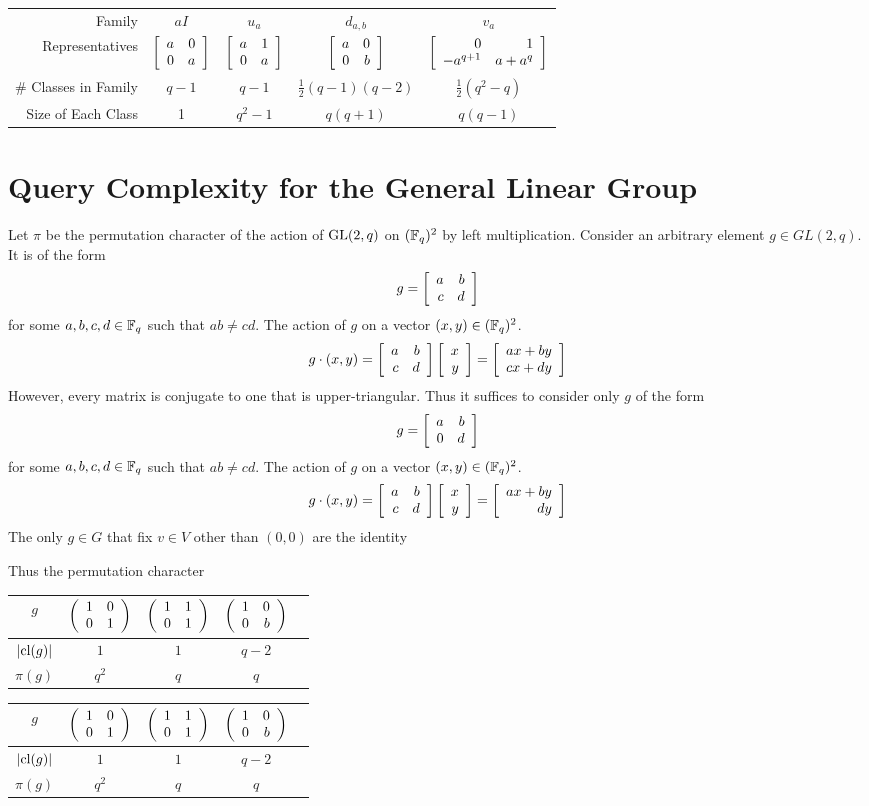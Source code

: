 \begin{center}
\begin{tabular}{r|cccc}
    Family & \vphantom{\Bigg|} $aI$ & $u_a$ & $d_{a,b}$ & $v_a$  \\
    \vphantom{\Bigg|}Representatives & $ \left[\begin{array}{rr}a&0\\0&a\end{array}\right]$ & $ \left[\begin{array}{rr}a&1\\0&a\end{array}\right]$ & $ \left[\begin{array}{rr}a&0\\0&b\end{array}\right] $ & $ 
    \left[\begin{array}{rr}0&1\\-a^{q+1}&a + a^q\end{array}\right]$ \\
\# Classes in Family & \vphantom{\Bigg|}$q-1$ & $q-1$ & $\frac{1}{2}(q-1)(q-2)$ & $\frac{1}{2}(q^2 -q)$ \\
\vphantom{\Bigg|} Size of Each Class & 1 & $q^2 - 1$ & $q(q+1)$ & $q(q-1)$
\end{tabular}
\end{center}




\section{Query Complexity for the General Linear Group}

Let $\pi$ be the permutation character of the action of $\operatorname{GL}(2, q)$ on $(\mathbb{F}_q)^2$ by left multiplication. Consider 
an arbitrary element $g \in GL(2,q)$. It is of the form
\[
    g = \left[\begin{array}{rr}a&b\\c&d\end{array}\right]
\]
for some $a,b,c,d \in \mathbb{F}_q$ such that $ab \neq cd$. The action of $g$ on a vector $(x,y) \in (\mathbb{F}_q)^2$.
\[
    g\cdot(x,y) = \left[\begin{array}{rr}a&b\\c&d\end{array}\right] \left[\begin{array}{r}x\\y\end{array}\right] = \left[\begin{array}{r}ax + by\\cx + dy\end{array}\right]
\]
However, every matrix is conjugate to one that is upper-triangular. Thus it suffices to consider only $g$ of the 
form
\[
    g = \left[\begin{array}{rr}a&b\\0&d\end{array}\right]
\]
for some $a,b,c,d \in \mathbb{F}_q$ such that $ab \neq cd$. The action of $g$ on a vector $(x,y) \in (\mathbb{F}_q)^2$.
\[
    g\cdot(x,y) = \left[\begin{array}{rr}a&b\\c&d\end{array}\right] \left[\begin{array}{r}x\\y\end{array}\right] = \left[\begin{array}{r}ax + by\\dy\end{array}\right]
\]
The only $g \in G$ that fix $v \in V$ other than $(0,0)$ are the identity


Thus the permutation character
\begin{center}
\begin{tabular}{c|cccc}
    \vphantom{\Bigg|} $g$ & $ \left(\begin{array}{rr}1&0\\0&1\end{array}\right)$ & $\left(\begin{array}{rr}1&1\\0&1\end{array}\right)$ &
    $\left(\begin{array}{rr}1&0\\0&b\end{array}\right)$ \\ \hline
\vphantom{\Bigg|} $|\text{cl}(g)|$ & $1$ & $1$ & $q-2$ \\
\vphantom{\Bigg|} $\pi(g)$ & $q^2$ & $q$ & $q$
\end{tabular}
\end{center}


\begin{center}
\begin{tabular}{c|cccc}
    \vphantom{\Bigg|} $g$ & $ \left(\begin{array}{rr}1&0\\0&1\end{array}\right)$ & $\left(\begin{array}{rr}1&1\\0&1\end{array}\right)$ &
    $\left(\begin{array}{rr}1&0\\0&b\end{array}\right)$ \\ \hline
\vphantom{\Bigg|} $|\text{cl}(g)|$ & $1$ & $1$ & $q-2$ \\
\vphantom{\Bigg|} $\pi(g)$ & $q^2$ & $q$ & $q$
\end{tabular}
\end{center}





